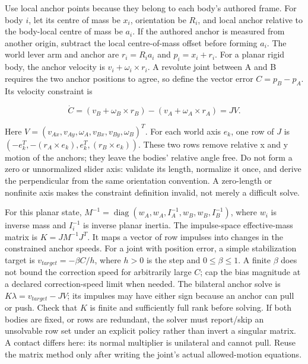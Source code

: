 Use local anchor points because they belong to each body's authored frame. For body \(i\), let its centre of mass be \(x_i\), orientation be \(R_i\), and local anchor relative to the body-local centre of mass be \(a_i\). If the authored anchor is measured from another origin, subtract the local centre-of-mass offset before forming \(a_i\). The world lever arm and anchor are \(r_i=R_i a_i\) and \(p_i=x_i+r_i\). For a planar rigid body, the anchor velocity is \(v_i+\omega_i\times r_i\). A revolute joint between A and B requires the two anchor positions to agree, so define the vector error \(C=p_B-p_A\). Its velocity constraint is

\[
\dot C=(v_B+\omega_B\times r_B)-(v_A+\omega_A\times r_A)=JV.
\]

Here \(V=(v_{Ax},v_{Ay},\omega_A,v_{Bx},v_{By},\omega_B)^T\). For each world axis \(e_k\), one row of \(J\) is \((-e_k^T,-(r_A\times e_k),e_k^T,(r_B\times e_k))\). These two rows remove relative x and y motion of the anchors; they leave the bodies' relative angle free. Do not form a zero or unnormalized slider axis: validate its length, normalize it once, and derive the perpendicular from the same orientation convention. A zero-length or nonfinite axis makes the constraint definition invalid, not merely a difficult solve.

For this planar state, \(M^{-1}=\operatorname{diag}(w_A,w_A,I_A^{-1},w_B,w_B,I_B^{-1})\), where \(w_i\) is inverse mass and \(I_i^{-1}\) is inverse planar inertia. The impulse-space effective-mass matrix is \(K=JM^{-1}J^T\). It maps a vector of row impulses into changes in the constrained anchor speeds. For a joint with position error, a simple stabilization target is \(v_{target}=-\beta C/h\), where \(h>0\) is the step and \(0\le\beta\le1\). A finite \(\beta\) does not bound the correction speed for arbitrarily large \(C\); cap the bias magnitude at a declared correction-speed limit when needed. The bilateral anchor solve is \(K\lambda=v_{target}-JV\); its impulses may have either sign because an anchor can pull or push. Check that \(K\) is finite and sufficiently full rank before solving. If both bodies are fixed, or rows are redundant, the solver must report/skip an unsolvable row set under an explicit policy rather than invert a singular matrix. A contact differs here: its normal multiplier is unilateral and cannot pull. Reuse the matrix method only after writing the joint's actual allowed-motion equations.

